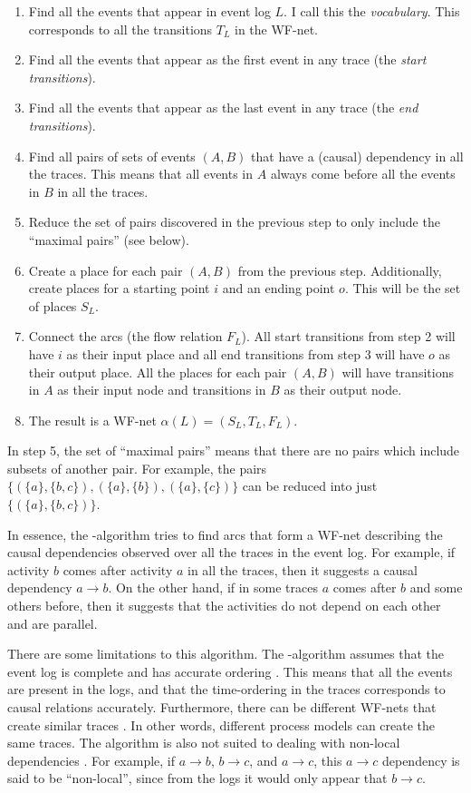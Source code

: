 \begin{enumerate}
    \item Find all the events that appear in event log $L$. I call this the \emph{vocabulary}. This corresponds to all the transitions $T_L$ in the WF-net.
    \item Find all the events that appear as the first event in any trace (the \emph{start transitions}).
    \item Find all the events that appear as the last event in any trace (the \emph{end transitions}).
    \item Find all pairs of sets of events $(A,B)$ that have a (causal) dependency in all the traces. This means that all events in $A$ always come before all the events in $B$ in all the traces.
    \item Reduce the set of pairs discovered in the previous step to only include the ``maximal pairs'' (see below). 
    \item Create a place for each pair $(A,B)$ from the previous step. Additionally, create places for a starting point $i$ and an ending point $o$. This will be the set of places $S_L$.
    \item Connect the arcs (the flow relation $F_L$). All start transitions from step 2 will have $i$ as their input place and all end transitions from step 3 will have $o$ as their output place. All the places for each pair $(A,B)$ will have transitions in $A$ as their input node and transitions in $B$ as their output node.
    \item The result is a WF-net $\alpha(L) = ( S_L, T_L, F_L )$.
\end{enumerate}

In step 5, the set of ``maximal pairs'' means that there are no pairs which include subsets of another pair. For example, the pairs $\{(\{a\},\{b,c\}),(\{a\},\{b\}),(\{a\},\{c\})\}$ can be reduced into just $\{(\{a\},\{b,c\})\}$.

In essence, the \textalpha-algorithm tries to find arcs that form a WF-net describing the causal dependencies observed over all the traces in the event log. 
For example, if activity $b$ comes after activity $a$ in all the traces, then it suggests a causal dependency $a \rightarrow b$.
On the other hand, if in some traces $a$ comes after $b$ and some others before, then it suggests that the activities do not depend on each other and are parallel.

There are some limitations to this algorithm.
The \textalpha-algorithm assumes that the event log is complete and has accurate ordering \cite{van2013discovering}. This means that all the events are present in the logs, and that the time-ordering in the traces corresponds to causal relations accurately. Furthermore, there can be different WF-nets that create similar traces \cite{van2013discovering}. In other words, different process models can create the same traces.
The algorithm is also not suited to dealing with non-local dependencies \cite{van2013discovering}.
For example, if $a \rightarrow b$, $b \rightarrow c$, and $a \rightarrow c$, this $a \rightarrow c$ dependency is said to be ``non-local'', since from the logs it would only appear that $b \rightarrow c$. 

